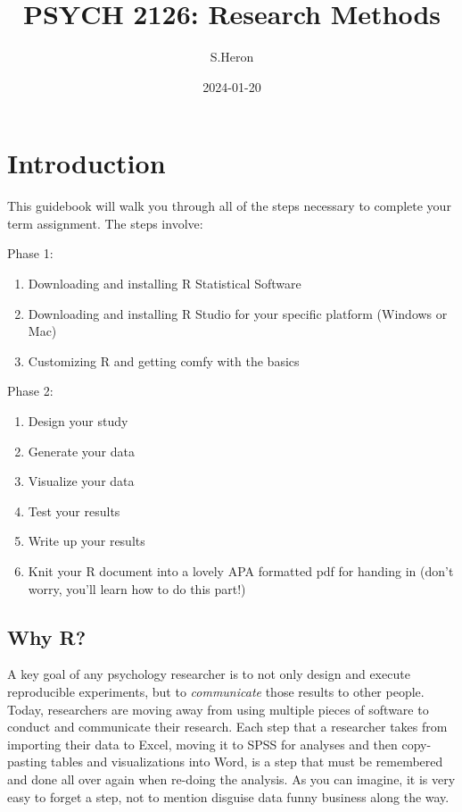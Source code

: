 \documentclass[
]{html}
\title{PSYCH 2126: Research Methods}
\author{S.Heron}
\date{2024-01-20}
\theoremstyle{definition}
\theoremstyle{definition}
\theoremstyle{definition}
\theoremstyle{definition}
\theoremstyle{remark}
\begin{document}
\maketitle

{
\setcounter{tocdepth}{2}
\tableofcontents
}
\hypertarget{introduction}{%
\section{Introduction}\label{introduction}}

This guidebook will walk you through all of the steps necessary to complete your term assignment. The steps involve:

Phase 1:

\begin{enumerate}
\def\labelenumi{\arabic{enumi}.}
\item
  Downloading and installing R Statistical Software
\item
  Downloading and installing R Studio for your specific platform (Windows or Mac)
\item
  Customizing R and getting comfy with the basics
\end{enumerate}

Phase 2:

\begin{enumerate}
\def\labelenumi{\arabic{enumi}.}
\item
  Design your study
\item
  Generate your data
\item
  Visualize your data
\item
  Test your results
\item
  Write up your results
\item
  Knit your R document into a lovely APA formatted pdf for handing in (don't worry, you'll learn how to do this part!)
\end{enumerate}

\hypertarget{why-r}{%
\subsection{Why R?}\label{why-r}}

A key goal of any psychology researcher is to not only design and execute reproducible experiments, but to \emph{communicate} those results to other people. Today, researchers are moving away from using multiple pieces of software to conduct and communicate their research. Each step that a researcher takes from importing their data to Excel, moving it to SPSS for analyses and then copy-pasting tables and visualizations into Word, is a step that must be remembered and done all over again when re-doing the analysis. As you can imagine, it is very easy to forget a step, not to mention disguise data funny business along the way.
\end{document}
